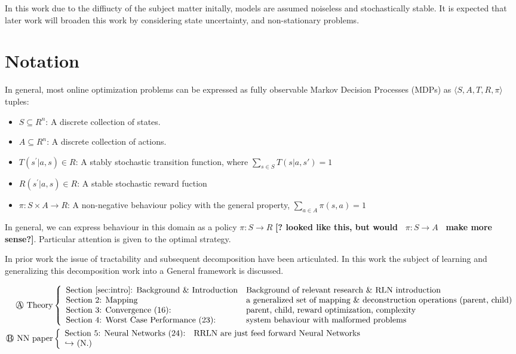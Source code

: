 In this work due to the diffiucty of the subject matter initally, models are assumed noiseless and stochastically stable. It is expected that later work will broaden this work by considering state uncertainty, and non-stationary problems.

\section*{Notation}

In general, most online optimization problems can be expressed as fully observable Markov Decision Processes (MDPs)
as \( \langle S, A, T, R,\pi \rangle \) tuples: 

\begin{itemize}  
\item $S \subseteq R^{n}$:  A discrete collection of states.
\item $A \subseteq R^{n}$:  A discrete collection of actions.
\item $T(s^\prime|a,s) \in R $:  A stably stochastic transition function, where $\sum_{s \in S} T(s|a,s') = 1 $
\item $R(s^\prime|a,s) \in R $:  A stable stochastic reward fuction
\item $\pi: S\times A \rightarrow R $:  A non-negative behaviour policy with the general property, $\sum_{a \in A} \pi(s,a) = 1$

\end{itemize}


In general, we can express behaviour in this domain as a policy \( \pi: S\rightarrow R\) {\textbf{[? looked like this, but would\ }}  \(\pi:S\rightarrow A \) 
{\textbf{\ make more sense?]}}. Particular attention is given to the optimal strategy.

In prior work the issue of tractability and subsequent decomposition have been articulated.  In this work the subject of learning
and generalizing this decomposition work into a General framework is discussed.

\begin{align*}
\text{\circled{A} Theory} & \left\{ 
\begin{array}{ll}
\text{Section \ref{sec:intro}: Background \& Introduction} & \text{Background of relevant research \& RLN introduction}\\
\text{Section 2: Mapping} & \text{a generalized set of mapping \& deconstruction operations (parent, child)} \\
\text{Section 3: Convergence (16):} & \text{parent, child, reward optimization, complexity} \\
\text{Section 4: Worst Case Performance (23):} & \text{system behaviour with malformed problems}
\end{array}
\right. \\
\text{\circled{B} NN paper} & \left\{ 
\begin{array}{ll}
\text{Section 5: Neural Networks (24):} & \text{RRLN are just feed forward Neural Networks} \\
\text{\(\hookrightarrow\) (N.)} &  \text{\ }
\end{array}
\right.
\end{align*}

